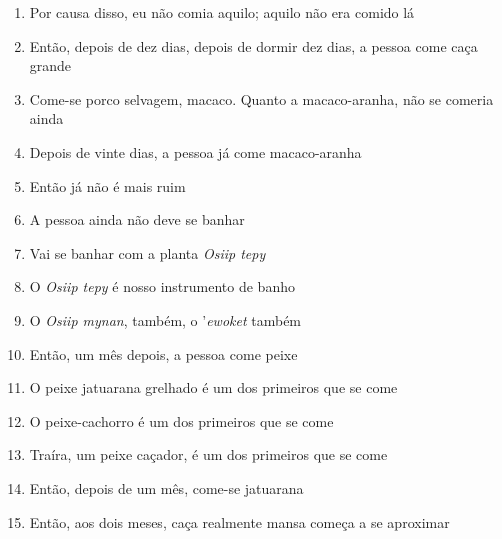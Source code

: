 \begin{enumerate}
 \item Por causa disso, eu não comia aquilo; aquilo não era comido lá

 \item Então, depois de dez dias, depois de dormir dez dias, a pessoa come
 caça grande

 \item Come-se porco selvagem, macaco. Quanto a macaco-aranha, não se comeria ainda

 \item Depois de vinte dias, a pessoa já come macaco-aranha

 \item Então já não é mais ruim

 \begin{center}\end{center}

 \item A pessoa ainda não deve se banhar

 \item Vai se banhar com a planta \textit{Osiip tepy}

 \item O \textit{Osiip tepy} é nosso instrumento de banho

 \item O \textit{Osiip mynan}, também, o '\textit{ewoket} também

 \begin{center}\end{center}

 \item Então, um mês depois, a pessoa come peixe

 \item O peixe jatuarana grelhado é um dos primeiros que se come

 \item O peixe-cachorro é um dos primeiros que se come

 \item Traíra, um peixe caçador, é um dos primeiros que se come

 \item Então, depois de um mês, come-se jatuarana

 \begin{center}\end{center}

 \item Então, aos dois meses, caça realmente mansa começa a se aproximar


\end{enumerate}
